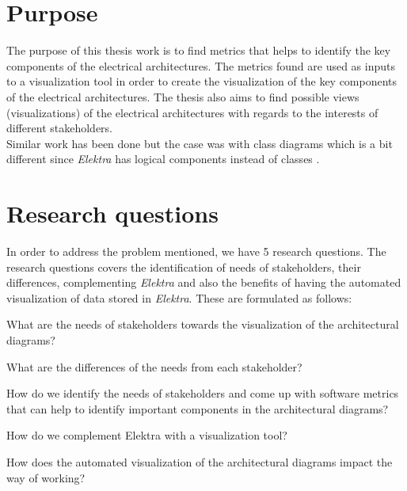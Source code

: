 \section{Purpose} \label{Purpose_ref}
The purpose of this thesis work is to find metrics that helps to identify the key components of the electrical architectures. The metrics found are used as inputs to a visualization tool in order to create the visualization of the key components of the electrical architectures. The thesis also aims to find possible views (visualizations) of the electrical architectures with regards to the interests of different stakeholders. \\

Similar work has been done but the case was with class diagrams which is a bit different since \textit{Elektra} has logical components instead of classes \cite{}.

\section{Research questions} \label{RQ_ref}
In order to address the problem mentioned, we have 5 research questions. The research questions covers the identification of needs of stakeholders, their differences, complementing \textit{Elektra} and also the benefits of having the automated visualization of data stored in \textit{Elektra}. These are formulated as follows:

\begin{que} \label{que:1}
What are the needs of stakeholders towards the visualization of the architectural diagrams?
\end{que}

\begin{que} \label{que:2}
What are the differences of the needs from each stakeholder?
\end{que}

\begin{que} \label{que:3}
How do we identify the needs of stakeholders and come up with software metrics that can help to identify important components in the architectural diagrams?
\end{que}

\begin{que}\label{que:4}
How do we complement Elektra with a visualization tool?
\end{que}

\begin{que} \label{que:5}
How does the automated visualization of the architectural diagrams impact the way of working?
\end{que}



